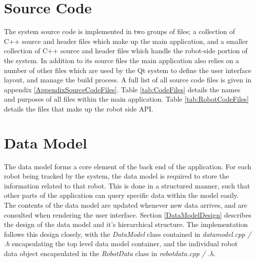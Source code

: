 
\section{Source Code}
The system source code is implemented in two groups of files; a collection of C++ source and header files which make up the main application, and a smaller collection of C++ source and header files which handle the robot-side portion of the system. In addition to its source files the main application also relies on a number of other files which are used by the Qt system to define the user interface layout, and manage the build process. A full list of all source code files is given in appendix \ref{AppendixSourceCodeFiles}. Table \ref{tab:CodeFiles} details the names and purposes of all files within the main application. Table \ref{tab:RobotCodeFiles} details the files that make up the robot side API.


\section{Data Model} \label{DataModel}
The data model forms a core element of the back end of the application. For each robot being tracked by the system, the data model is required to store the information related to that robot. This is done in a structured manner, such that other parts of the application can query specific data within the model easily. The contents of the data model are updated whenever new data arrives, and are consulted when rendering the user interface. Section \ref{DataModelDesign} describes the design of the data model and it's hierarchical structure. The implementation follows this design closely, with the \textit{DataModel} class contained in \textit{datamodel.cpp / .h} encapsulating the top level data model container, and the individual robot data object encapsulated in the \textit{RobotData} class in \textit{robotdata.cpp / .h}.

